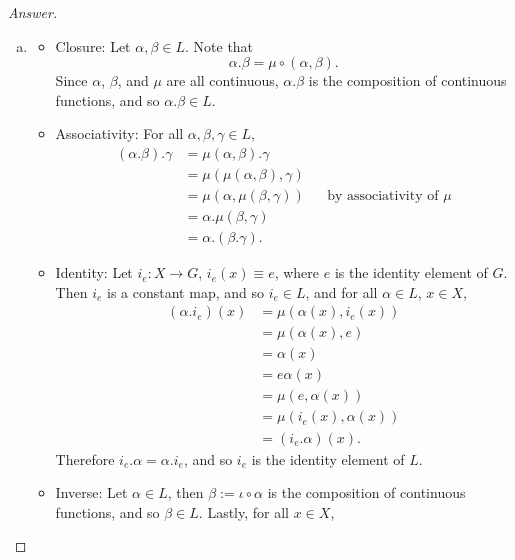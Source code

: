 \documentclass[12pt]{article}
\newcommand\paren[1]{\left( #1 \right)}
\theoremstyle{definition}
\begin{document}
\begin{proof}[Answer]   
    \noindent
    \begin{enumerate}[(a)]
        \item 
        \begin{itemize}
            \item Closure: Let $\alpha, \beta \in L$. Note that 
            \[
                \alpha . \beta = \mu \circ \paren{ \alpha , \beta }.
            \]
            Since $\alpha$, $\beta$, and $\mu$ are all continuous, $\alpha . \beta$ is the composition of continuous functions, and so $\alpha . \beta \in L$.
            \item Associativity: For all $\alpha , \beta , \gamma \in L$,
            \begin{align*}
                \paren{ \alpha . \beta } . \gamma & = \mu(\alpha , \beta) . \gamma \\
                & = \mu \paren{ \mu(\alpha, \beta) , \gamma } \\
                & = \mu \paren{ \alpha , \mu(\beta,\gamma) } && \text{by associativity of $\mu$} \\
                & = \alpha . \mu(\beta,\gamma) \\
                & = \alpha . ( \beta . \gamma).
            \end{align*}
            \item Identity: Let $i_e : X \to G$, $i_e(x) \equiv e$, where $e$ is the identity element of $G$. Then $i_e$ is a constant map, and so $i_e \in L$, and for all $\alpha \in L$, $x \in X$,
            \begin{align*}
                \paren{ \alpha . i_e }(x) & = \mu \paren{ \alpha(x) , i_e(x) } \\
                & = \mu \paren{ \alpha(x) , e } \\
                & = \alpha(x) \\
                & = e \alpha(x) \\
                & = \mu \paren{ e , \alpha(x) } \\
                & = \mu \paren{ i_e(x) , \alpha(x) } \\
                & = \paren{ i_e . \alpha }(x).
            \end{align*}
            Therefore $i_e . \alpha = \alpha . i_e$, and so $i_e$ is the identity element of $L$.
            \item Inverse: Let $\alpha \in L$, then $\beta := \iota \circ \alpha$ is the composition of continuous functions, and so $\beta \in L$. Lastly, for all $x \in X$,

\end{itemize}
\end{enumerate}
\end{proof}
\end{document}
